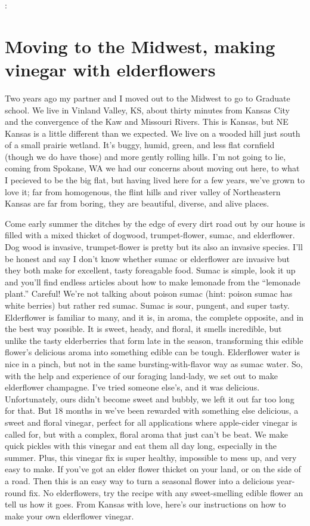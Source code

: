 \documentclass[10pt,a6paper,footinclude=false,firstfoot=false,headinclude=true,open=any,DIV=6]{scrbook} %
\begin{document}
\vspace{2ex}
\noindent{}:
\vspace{1ex}


\chapter{Moving to the Midwest, making vinegar with elderflowers}

Two years ago my partner and I moved out to the Midwest to go to Graduate school. We live in Vinland Valley, KS, about thirty minutes from Kansas City and the convergence of the Kaw and Missouri Rivers. This is Kansas, but NE Kansas is a little different than we expected. We live on a wooded hill just south of a small prairie wetland. It's buggy, humid, green, and less flat cornfield (though we do have those) and more gently rolling hills. I'm not going to lie, coming from Spokane, WA we had our concerns about moving out here, to what I pecieved to be the big flat, but having lived here for a few years, we've grown to love it; far from homogenous, the flint hills and river valley of Northeastern Kansas are far from boring, they are beautiful, diverse, and alive places.

Come early summer the ditches by the edge of every dirt road out by our house is filled with a mixed thicket of dogwood, trumpet-flower, sumac, and elderflower. Dog wood is invasive, trumpet-flower is pretty but its also an invasive species. I'll be honest and say I don't know whether sumac or elderflower are invasive but they both make for excellent, tasty foreagable food. Sumac is simple, look it up and you'll find endless articles about how to make lemonade from the ``lemonade plant.'' Careful! We're not talking about poison sumac (hint: poison sumac has white berries) but rather red sumac. Sumac is sour, pungent, and super tasty. Elderflower is familiar to many, and it is, in aroma, the complete opposite, and in the best way possible. It is sweet, heady, and floral, it smells incredible, but unlike the tasty elderberries that form late in the season, transforming this edible flower's delicious aroma into something edible can be tough. Elderflower water is nice in a pinch, but not in the same bursting-with-flavor way as sumac water. So, with the help and experience of our foraging land-lady, we set out to make elderflower champagne. I've tried someone else's, and it was delicious. Unfortunately, ours didn't become sweet and bubbly, we left it out far too long for that. But 18 months in we've been rewarded with something else delicious, a sweet and floral vinegar, perfect for all applications where apple-cider vinegar is called for, but with a complex, floral aroma that just can't be beat. We make quick pickles with this vinegar and eat them all day long, especially in the summer. Plus, this vinegar fix is super healthy, impossible to mess up, and very easy to make. If you've got an elder flower thicket on your land, or on the side of a road. Then this is an easy way to turn a seasonal flower into a delicious year-round fix. No elderflowers, try the recipe with any sweet-smelling edible flower an tell us how it goes. From Kansas with love, here's our instructions on how to make your own elderflower vinegar.
\end{document}
